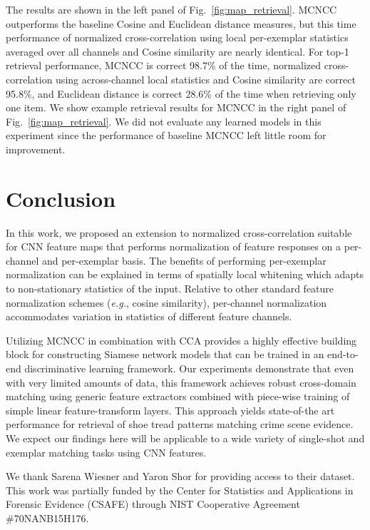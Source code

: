 \documentclass[twocolumn]{svjour3}           %
\newcommand{\eg}{\emph{e.g.}}
\begin{document}
The results are shown in the left panel of Fig.~\ref{fig:map_retrieval}.  MCNCC
outperforms the baseline Cosine and Euclidean distance measures, but this time
performance of normalized cross-correlation using local per-exemplar statistics
averaged over all channels and Cosine similarity are nearly identical.  For
top-1 retrieval performance, MCNCC is correct 98.7\% of the time, normalized
cross-correlation using across-channel local statistics and Cosine similarity
are correct 95.8\%, and Euclidean distance is correct 28.6\% of the time when
retrieving only one item.  We show example retrieval results for MCNCC in the
right panel of Fig.~\ref{fig:map_retrieval}. We did not evaluate any learned
models in this experiment since the performance of baseline MCNCC left little
room for improvement.



\section{Conclusion}

In this work, we proposed an extension to normalized cross-correlation suitable
for CNN feature maps that performs normalization of feature responses on a
per-channel and per-exemplar basis. The benefits of performing per-exemplar
normalization can be explained in terms of spatially local whitening which
adapts to non-stationary statistics of the input.  Relative to other standard
feature normalization schemes (\eg, cosine similarity), per-channel
normalization accommodates variation in statistics of different feature
channels. 

Utilizing MCNCC in combination with CCA provides a highly effective building
block for constructing Siamese network models that can be trained in an
end-to-end discriminative learning framework.  Our experiments demonstrate that
even with very limited amounts of data, this framework achieves robust
cross-domain matching using generic feature extractors combined with piece-wise
training of simple linear feature-transform layers. This approach yields
state-of-the art performance for retrieval of shoe tread patterns matching
crime scene evidence.  We expect our findings here will be applicable to a wide
variety of single-shot and exemplar matching tasks using CNN features.

\begin{acknowledgements}
We thank Sarena Wiesner and Yaron Shor for providing access to their dataset. 
This work was partially funded by the Center for Statistics and Applications in
Forensic Evidence (CSAFE) through NIST Cooperative Agreement \#70NANB15H176.
\end{acknowledgements}
\end{document}
